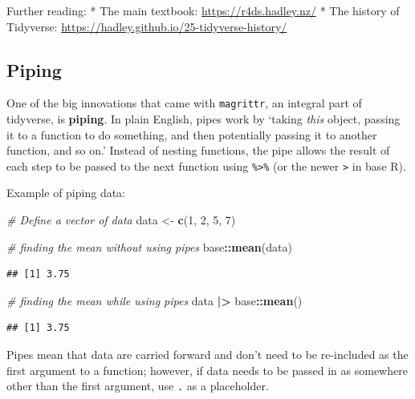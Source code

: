 \documentclass[
]{book}
\newenvironment{Shaded}{\begin{snugshade}}{\end{snugshade}}
\newcommand{\CommentTok}[1]{\textcolor[rgb]{0.56,0.35,0.01}{\textit{#1}}}
\newcommand{\DecValTok}[1]{\textcolor[rgb]{0.00,0.00,0.81}{#1}}
\newcommand{\FunctionTok}[1]{\textcolor[rgb]{0.13,0.29,0.53}{\textbf{#1}}}
\newcommand{\NormalTok}[1]{#1}
\newcommand{\OtherTok}[1]{\textcolor[rgb]{0.56,0.35,0.01}{#1}}
\newcommand{\SpecialCharTok}[1]{\textcolor[rgb]{0.81,0.36,0.00}{\textbf{#1}}}
\begin{document}
Further reading:
* The main textbook: \url{https://r4ds.hadley.nz/}
* The history of Tidyverse: \url{https://hadley.github.io/25-tidyverse-history/}

\subsection{Piping}\label{sec:piping}

One of the big innovations that came with \texttt{magrittr}, an integral part of tidyverse, is \textbf{piping}. In plain English, pipes work by `taking \emph{this} object, passing it to a function to do something, and then potentially passing it to another function, and so on.' Instead of nesting functions, the pipe allows the result of each step to be passed to the next function using \texttt{\%\textgreater{}\%} (or the newer \texttt{\textbar{}\textgreater{}} in base R).

Example of piping data:

\begin{Shaded}
\begin{Highlighting}[]
\CommentTok{\# Define a vector of data }
\NormalTok{data }\OtherTok{\textless{}{-}} \FunctionTok{c}\NormalTok{(}\DecValTok{1}\NormalTok{, }\DecValTok{2}\NormalTok{, }\DecValTok{5}\NormalTok{, }\DecValTok{7}\NormalTok{)}

\CommentTok{\# finding the mean without using pipes}
\NormalTok{base}\SpecialCharTok{::}\FunctionTok{mean}\NormalTok{(data)}
\end{Highlighting}
\end{Shaded}

\begin{verbatim}
## [1] 3.75
\end{verbatim}

\begin{Shaded}
\begin{Highlighting}[]
\CommentTok{\# finding the mean while using pipes}
\NormalTok{data }\SpecialCharTok{|\textgreater{}}\NormalTok{ base}\SpecialCharTok{::}\FunctionTok{mean}\NormalTok{()}
\end{Highlighting}
\end{Shaded}

\begin{verbatim}
## [1] 3.75
\end{verbatim}

Pipes mean that data are carried forward and don't need to be re-included as the first argument to a function; however, if data needs to be passed in as somewhere other than the first argument, use \texttt{.} as a placeholder.
\end{document}
